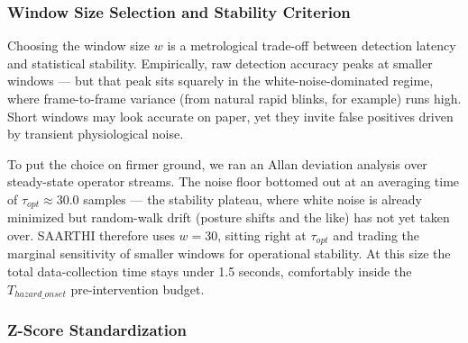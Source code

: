 \begin{algorithm}[h]
\caption{Adaptive Rolling Window Data Ingestion}
\label{alg:ingestion}
\end{algorithm}

\subsubsection{Window Size Selection and Stability Criterion}

Choosing the window size $w$ is a metrological trade-off between detection
latency and statistical stability. Empirically, raw detection accuracy peaks at
smaller windows --- but that peak sits squarely in the white-noise-dominated
regime, where frame-to-frame variance (from natural rapid blinks, for example)
runs high. Short windows may look accurate on paper, yet they invite false
positives driven by transient physiological noise.

To put the choice on firmer ground, we ran an Allan deviation analysis over
steady-state operator streams. The noise floor bottomed out at an averaging time
of $\tau_{opt} \approx 30.0$ samples --- the stability plateau, where white noise
is already minimized but random-walk drift (posture shifts and the like) has not
yet taken over. SAARTHI therefore uses $w = 30$, sitting right at $\tau_{opt}$
and trading the marginal sensitivity of smaller windows for operational
stability. At this size the total data-collection time stays under 1.5 seconds,
comfortably inside the $T_{hazard\_onset}$ pre-intervention budget.

\subsubsection{Z-Score Standardization}

